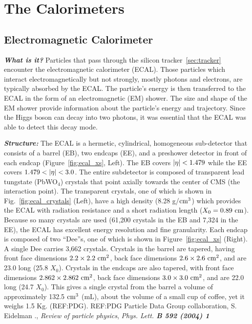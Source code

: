 \section{The Calorimeters}
\label{sec:calo}

\subsection{Electromagnetic Calorimeter}
\label{subsec:ecal}

\textit{\textbf{What is it?}}
Particles that pass through the silicon tracker~\ref{sec:tracker} encounter the electromagnetic calorimeter (ECAL).
Those particles which interact electromagnetically but not strongly, mostly photons and electrons, are typically absorbed by the ECAL.
The particle's energy is then transferred to the ECAL in the form of an electromagnetic (EM) shower.
The size and shape of the EM shower provide information about the particle's energy and trajectory.
Since the Higgs boson can decay into two photons, it was essential that the ECAL was able to detect this decay mode.

\textit{\textbf{Structure:}}
The ECAL is a hermetic, cylindrical, homogeneous sub-detector that consists of a barrel (EB), two endcaps (EE), and a preshower detector in front of each endcap (Figure~\ref{fig:ecal_xs}, Left).
The EB covers $\left|\eta\right| < 1.479$ while the EE covers $1.479 < \left|\eta\right| < 3.0$.
The entire subdetector is composed of transparent lead tungstate (PbWO$_4$) crystals that point axially towards the center of CMS (the interaction point).
The transparent crystals, one of which is shown in Fig.~\ref{fig:ecal_crystals} (Left), have a high density (8.28 g/$\text{cm}^3$) which provides the ECAL with radiation resistance and a short radiation length ($X_0 = 0.89~\text{cm}$).
Because so many crystals are used (61,200 crystals in the EB and 7,324 in the EE), the ECAL has excellent energy resolution and fine granularity.
Each endcap is composed of two ``Dee''s, one of which is shown in Figure~\ref{fig:ecal_xs} (Right).
A single Dee carries 3,662 crystals.
Crystals in the barrel are tapered, having front face dimensions $2.2 \times 2.2~\text{cm}^2$, back face dimensions $2.6 \times 2.6~\text{cm}^2$, and are 23.0 \cm long (25.8 $X_0$).
Crystals in the endcaps are also tapered, with front face dimensions $2.862 \times 2.862~\text{cm}^2$, back face dimensions $3.0 \times 3.0~\text{cm}^2$, and are 22.0 \cm long (24.7 $X_0$).
This gives a single crystal from the barrel a volume of approximately 132.5 $\text{cm}^3$ (mL), about the volume of a small cup of coffee, yet it weighs 1.5 Kg.
(REF:PDG).
REF:PDG
Particle Data Group collaboration, S. Eidelman \etal., \textit{Review of particle physics},
\textit{Phys. Lett. \textbf{B 592 (2004) 1}}

